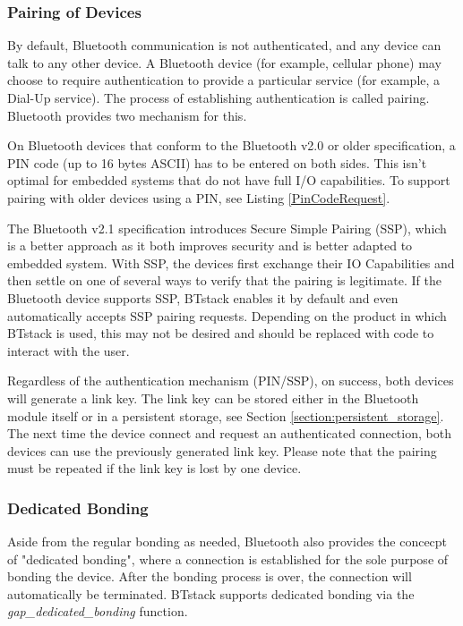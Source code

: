 \subsubsection{Pairing of Devices}
By default, Bluetooth communication is not authenticated, and any device can talk to any other device. A Bluetooth device (for example, cellular phone) may choose to require authentication to provide a particular service (for example, a Dial-Up service). The process of establishing authentication is called pairing. Bluetooth provides two mechanism for this.

On Bluetooth devices that conform to the Bluetooth v2.0 or older specification, a PIN code (up to 16 bytes ASCII) has to be entered on both sides. This isn't optimal for embedded systems that do not have full I/O capabilities. To support pairing with older devices using a PIN, see Listing \ref{PinCodeRequest}.

The Bluetooth v2.1 specification introduces Secure Simple Pairing (SSP), which is a better approach as it both improves security and is better adapted to embedded system. With SSP, the devices first exchange their IO Capabilities and then settle on one of several ways to verify that the pairing is legitimate. If the Bluetooth device supports SSP, BTstack enables it by default and even automatically accepts SSP pairing requests. Depending on the product in which BTstack is used, this may not be desired and should be replaced with code to interact with the user.

Regardless of the authentication mechanism (PIN/SSP), on success, both devices will generate a link key. The link key can be stored either in the Bluetooth module itself or in a persistent storage, see Section \ref{section:persistent_storage}. The next time the device connect and request an authenticated connection, both devices can use the previously generated link key. Please note that the pairing must be repeated if the link key is lost by one device.

\subsubsection{Dedicated Bonding}
Aside from the regular bonding as needed, Bluetooth also provides the concecpt of "dedicated bonding", where a connection is established for the sole purpose of bonding the device. After the bonding process is over, the connection will automatically be terminated. BTstack supports dedicated bonding via the \emph{gap\_dedicated\_bonding} function.

